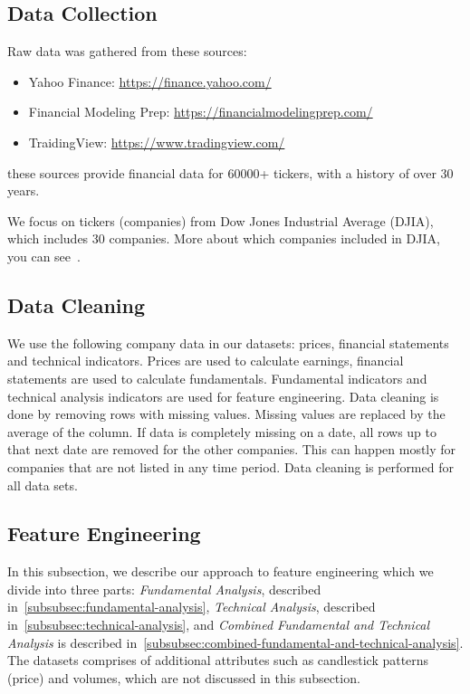 \documentclass[../xlapes02]{subfiles}
\begin{document}
    \subsection{Data Collection}\label{subsec:data-collection}
    Raw data was gathered from these sources:
    \begin{itemize}
        \label{item:data-sources}
        \item Yahoo Finance: \url{https://finance.yahoo.com/}
        \item Financial Modeling Prep: \url{https://financialmodelingprep.com/}
        \item TraidingView: \url{https://www.tradingview.com/}
    \end{itemize}
    these sources provide financial data for 60000+ tickers, with a history of over 30 years.

    We focus on tickers (companies) from Dow Jones Industrial Average (DJIA), which includes 30 companies. More about which companies included in DJIA, you can see~\cite{enwiki:1141766585}.

    \subsection{Data Cleaning}\label{subsec:data-cleaning}
    We use the following company data in our datasets: prices, financial statements and technical indicators. Prices are used to calculate earnings, financial statements are used to calculate fundamentals. Fundamental indicators and technical analysis indicators are used for feature engineering. Data cleaning is done by removing rows with missing values. Missing values are replaced by the average of the column. If data is completely missing on a date, all rows up to that next date are removed for the other companies. This can happen mostly for companies that are not listed in any time period. Data cleaning is performed for all data sets.

    \subsection{Feature Engineering}\label{subsec:feature-engineering}
    In this subsection, we describe our approach to feature engineering which we divide into three parts: \emph{Fundamental Analysis}, described in~\cref{subsubsec:fundamental-analysis}, \emph{Technical Analysis}, described in~\cref{subsubsec:technical-analysis}, and \emph{Combined Fundamental and Technical Analysis} is described in~\cref{subsubsec:combined-fundamental-and-technical-analysis}. The datasets comprises of additional attributes such as candlestick patterns (price) and volumes, which are not discussed in this subsection.
\end{document}
